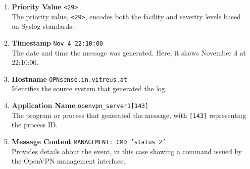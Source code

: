 \begin{enumerate}
    \item \textbf{Priority Value} \texttt{<29>} \\
    The priority value, \texttt{<29>}, encodes both the facility and severity levels based on Syslog standards.

    \item \textbf{Timestamp} \texttt{Nov 4 22:10:00} \\
    The date and time the message was generated. Here, it shows November 4 at 22:10:00.

    \item \textbf{Hostname} \texttt{OPNsense.in.vitreus.at} \\
    Identifies the source system that generated the log.

    \item \textbf{Application Name} \texttt{openvpn\_server1[143]} \\
    The program or process that generated the message, with \texttt{[143]} representing the process ID.

    \item \textbf{Message Content} \texttt{MANAGEMENT: CMD 'status 2'} \\
    Provides details about the event, in this case showing a command issued by the OpenVPN management interface.
\end{enumerate}
